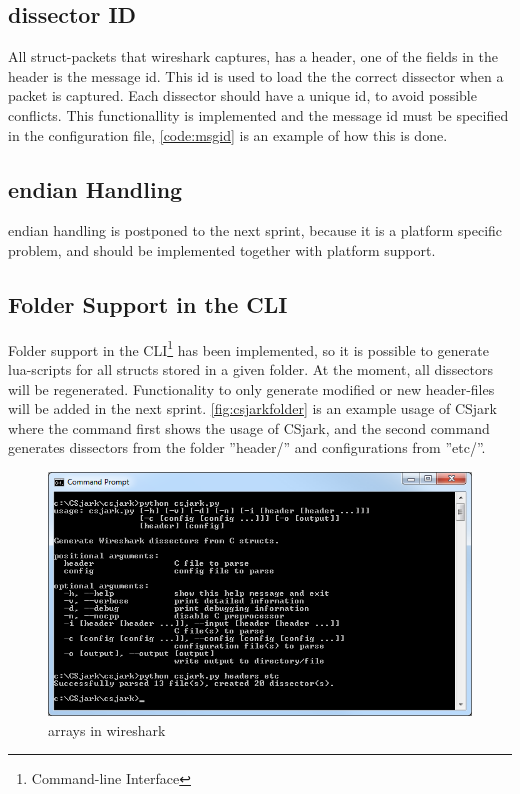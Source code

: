 \subsection{\Gls{dissector} ID}
All \gls{struct}-\glspl{packet} that \Gls{wireshark} captures, has a \gls{header}, one of the fields in 
the \gls{header} is the message id. This id is used to load the the correct 
\gls{dissector} when a \gls{packet} is captured. Each \gls{dissector} should have a unique id, 
to avoid possible conflicts. This functionallity is implemented and the 
message id must be specified in the configuration file, \autoref{code:msgid} 
is an example of how this is done.



\subsection{\Gls{endian} Handling}
\Gls{endian} handling is postponed to the next sprint, because it is a platform 
specific problem, and should be implemented together with platform support.

\subsection{Folder Support in the CLI}
Folder support in the CLI\footnote{Command-line Interface} has been 
implemented, so it is possible to generate \Gls{lua}-\glspl{script} for all \glspl{struct} stored 
in a given folder. At the moment, all \glspl{dissector} will be regenerated. 
Functionality to only generate modified or new \gls{header}-files will be added in 
the next sprint. \autoref{fig:csjarkfolder} is an example usage of CSjark where
the command first shows the usage of CSjark, and the second command 
generates \glspl{dissector} from the folder ''\gls{header}/'' and configurations from ''etc/''.

\begin{figure}[ht]
	\center
	\includegraphics[width=\textwidth]{./sprints/img/csjark_folder}
	\caption{\Glspl{array} in \Gls{wireshark}\label{fig:csjarkfolder}}
\end{figure}

